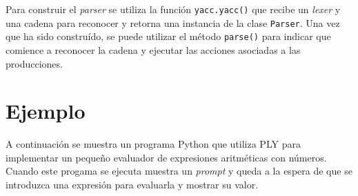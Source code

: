 \documentclass{article}
\begin{document}
Para construir el \textit{parser} se utiliza la función \texttt{yacc.yacc()}
que recibe un \textit{lexer} y una cadena para reconocer y retorna una instancia
de la clase \texttt{Parser}. Una vez que ha sido construído, se puede utilizar
el método \texttt{parse()} para indicar que comience a reconocer la cadena y
ejecutar las acciones asociadas a las producciones.

\section{Ejemplo}
\label{sec:ejemplo}

A continuación se muestra un programa Python que utiliza PLY para implementar
un pequeño evaluador de expresiones aritméticas con números. Cuando este
progama se ejecuta muestra un \textit{prompt} y queda a la espera de que se
introduzca una expresión para evaluarla y mostrar su valor.

\begin{quote}
\begin{verbatim}
\end{verbatim}
\end{quote}
\end{document}
